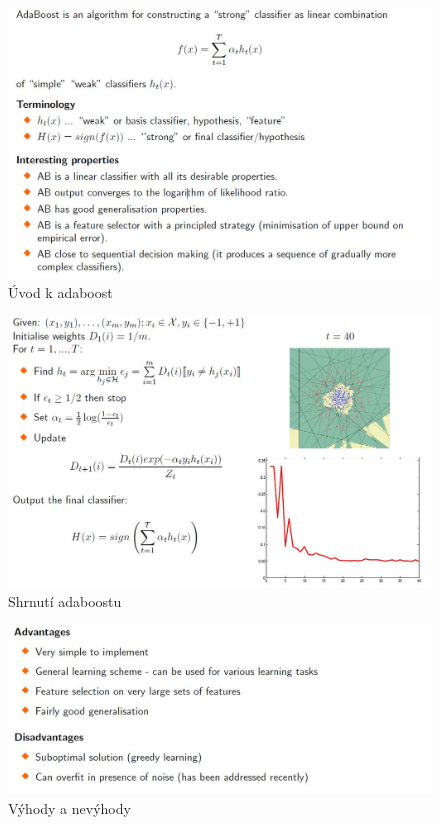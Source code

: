 \documentclass{article}
\begin{document}
\begin{figure}[h]
\begin{center}
\includegraphics[width=12cm]{adaboost_introduction.jpg}
\caption{Úvod k adaboost}
\label{fig:adaboost_itroduction}
\end{center}
\end{figure}

\begin{figure}[h]
\begin{center}
\includegraphics[width=12cm]{adaboost_summary.jpg}
\caption{Shrnutí adaboostu}
\label{fig:adaboost_summary}
\end{center}
\end{figure}

\begin{figure}[h]
\begin{center}
\includegraphics[width=12cm]{adaboost_pros_cons.jpg}
\caption{Výhody a nevýhody}
\label{fig:adaboost_pros_cons}
\end{center}
\end{figure}
\end{document}
